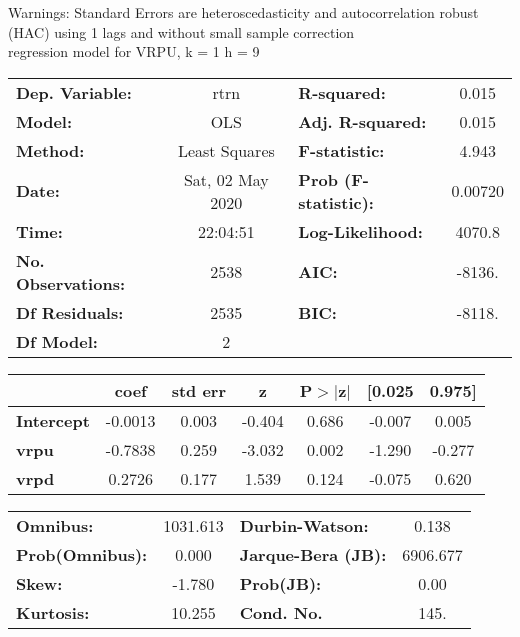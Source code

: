 Warnings: \newline
 [1] Standard Errors are heteroscedasticity and autocorrelation robust (HAC) using 1 lags and without small sample correction\\ 

regression model for VRPU, k = 1 h = 9\begin{center}
\begin{tabular}{lclc}
\toprule
\textbf{Dep. Variable:}    &       rtrn       & \textbf{  R-squared:         } &     0.015   \\
\textbf{Model:}            &       OLS        & \textbf{  Adj. R-squared:    } &     0.015   \\
\textbf{Method:}           &  Least Squares   & \textbf{  F-statistic:       } &     4.943   \\
\textbf{Date:}             & Sat, 02 May 2020 & \textbf{  Prob (F-statistic):} &  0.00720    \\
\textbf{Time:}             &     22:04:51     & \textbf{  Log-Likelihood:    } &    4070.8   \\
\textbf{No. Observations:} &        2538      & \textbf{  AIC:               } &    -8136.   \\
\textbf{Df Residuals:}     &        2535      & \textbf{  BIC:               } &    -8118.   \\
\textbf{Df Model:}         &           2      & \textbf{                     } &             \\
\bottomrule
\end{tabular}
\begin{tabular}{lcccccc}
                   & \textbf{coef} & \textbf{std err} & \textbf{z} & \textbf{P$> |$z$|$} & \textbf{[0.025} & \textbf{0.975]}  \\
\midrule
\textbf{Intercept} &      -0.0013  &        0.003     &    -0.404  &         0.686        &       -0.007    &        0.005     \\
\textbf{vrpu}      &      -0.7838  &        0.259     &    -3.032  &         0.002        &       -1.290    &       -0.277     \\
\textbf{vrpd}      &       0.2726  &        0.177     &     1.539  &         0.124        &       -0.075    &        0.620     \\
\bottomrule
\end{tabular}
\begin{tabular}{lclc}
\textbf{Omnibus:}       & 1031.613 & \textbf{  Durbin-Watson:     } &    0.138  \\
\textbf{Prob(Omnibus):} &   0.000  & \textbf{  Jarque-Bera (JB):  } & 6906.677  \\
\textbf{Skew:}          &  -1.780  & \textbf{  Prob(JB):          } &     0.00  \\
\textbf{Kurtosis:}      &  10.255  & \textbf{  Cond. No.          } &     145.  \\
\bottomrule
\end{tabular}
\end{center}

